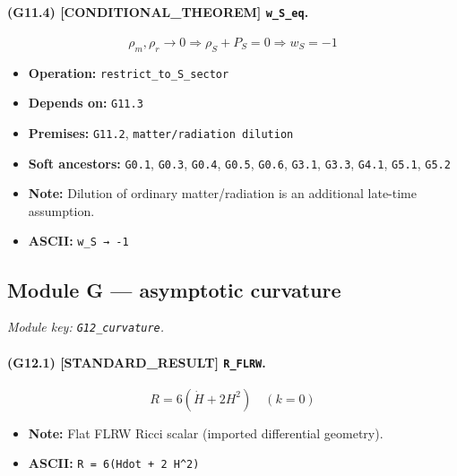 \documentclass[11pt,a4paper]{article}
\theoremstyle{remark}\newtheorem*{caution}{Caution}
\newcommand{\tagbox}[1]{\textsc{[#1]}}
\begin{document}
\paragraph{(G11.4) \tagbox{CONDITIONAL\_THEOREM} \texttt{w\_S\_eq}.}
\begin{equation}
\rho_m,\rho_r\to 0\Rightarrow\rho_S+P_S=0\Rightarrow w_S=-1
\tag{G11.4}
\end{equation}
\begin{itemize}\setlength{\itemsep}{0.12em}
\item \textbf{Operation:} \texttt{restrict\_to\_S\_sector}
\item \textbf{Depends on:} \texttt{G11.3}
\item \textbf{Premises:} \texttt{G11.2}, \texttt{matter/radiation dilution}
\item \textbf{Soft ancestors:} \texttt{G0.1}, \texttt{G0.3}, \texttt{G0.4}, \texttt{G0.5}, \texttt{G0.6}, \texttt{G3.1}, \texttt{G3.3}, \texttt{G4.1}, \texttt{G5.1}, \texttt{G5.2}
\item \textbf{Note:} Dilution of ordinary matter/radiation is an additional late-time assumption.
\item \textbf{ASCII:} \texttt{w\_S → -1}
\end{itemize}
\subsection{Module G --- asymptotic curvature}
\textit{Module key: \texttt{G12\_curvature}.}
\paragraph{(G12.1) \tagbox{STANDARD\_RESULT} \texttt{R\_FLRW}.}
\begin{equation}
R=6(\dot H+2H^2)\quad(k=0)
\tag{G12.1}
\end{equation}
\begin{itemize}\setlength{\itemsep}{0.12em}
\item \textbf{Note:} Flat FLRW Ricci scalar (imported differential geometry).
\item \textbf{ASCII:} \texttt{R = 6(Hdot + 2 H^2)}
\end{itemize}
\end{document}
